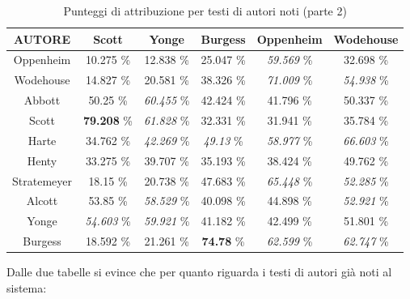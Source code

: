 \documentclass[titlepage]{article}
\begin{document}
\begin{table}[htp]
\centering
\footnotesize
\begin{tabular}{cccccc}
    \toprule
    \textbf{AUTORE} & \textbf{Scott} & \textbf{Yonge} & \textbf{Burgess} & \textbf{Oppenheim} & \textbf{Wodehouse} \\
    
    \midrule
    Oppenheim & 10.275 \% & 12.838 \% & 25.047 \% & \textit{59.569} \% & 32.698 \% \\
    
    \midrule
    Wodehouse & 14.827 \% & 20.581 \% & 38.326 \% & \textit{71.009} \% & \textit{54.938} \% \\
    
    \midrule
    Abbott & 50.25 \% & \textit{60.455} \% & 42.424 \% & 41.796 \% & 50.337 \% \\
    
    \midrule
    Scott & \textbf{79.208} \% & \textit{61.828} \% & 32.331 \% & 31.941 \% & 35.784 \% \\
    
    \midrule
    Harte & 34.762 \% & \textit{42.269} \% & \textit{49.13} \% & \textit{58.977} \% & \textit{66.603} \% \\
    
    \midrule
    Henty & 33.275 \% & 39.707 \% & 35.193 \% & 38.424 \% & 49.762 \% \\
    
    \midrule
    Stratemeyer & 18.15 \% & 20.738 \% & 47.683 \% & \textit{65.448} \% & \textit{52.285} \% \\
    
    \midrule
    Alcott & 53.85 \% & \textit{58.529} \% & 40.098 \% & 44.898 \% & \textit{52.921} \% \\
    
    \midrule
    Yonge & \textit{54.603} \% & \textit{59.921} \% & 41.182 \% & 42.499 \% & 51.801 \% \\
    
    \midrule
    Burgess & 18.592 \% & 21.261 \% & \textbf{74.78} \% & \textit{62.599} \% & \textit{62.747} \% \\
    
    \bottomrule
\end{tabular}
\caption{Punteggi di attribuzione per testi di autori noti (parte 2)}
\end{table}
\newpage
\noindent
Dalle due tabelle si evince che per quanto riguarda i testi di autori già noti al sistema:
\end{document}
